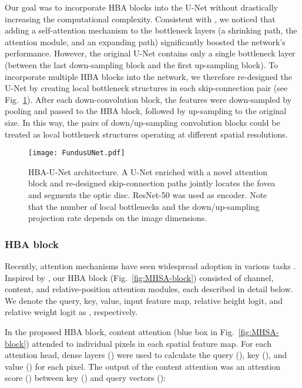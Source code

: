 \documentclass[hidelinks,runningheads]{llncs}
\begin{document}
Our goal was to incorporate \ac{HBA} blocks into the U-Net without drastically increasing the computational complexity.
Consistent with \cite{srinivas_bottleneck_2021}, we noticed that adding a self-attention mechanism to the bottleneck layers (a shrinking path, the attention module, and an expanding path) significantly boosted the network's performance.
However, the original U-Net contains only a single bottleneck layer (between the last down-sampling block and the first up-sampling block).
To incorporate multiple HBA blocks into the network, we therefore re-designed the U-Net by creating local bottleneck structures in each skip-connection pair (see Fig.~\ref{fig:architecture}).
After each down-convolution block, the features were down-sampled by pooling and passed to the HBA block, followed by up-sampling to the original size. In this way, the pairs of down/up-sampling convolution blocks could be treated as local bottleneck structures operating at different spatial resolutions. 

\begin{figure}[!t]
    \centering
    \texttt{[image: FundusUNet.pdf]}
    \caption{HBA-U-Net architecture. A U-Net enriched with a novel attention block and re-designed skip-connection paths jointly locates the fovea and segments the optic disc. ResNet-50 was used as encoder. Note that the number of local bottlenecks and the down/up-sampling projection rate depends on the image dimensions. }
    \label{fig:architecture}
\end{figure}


\subsubsection{HBA block}



Recently, attention mechanisms have seen widespread adoption in various tasks \cite{vaswani_attention_2017}. 
Inspired by \cite{srinivas_bottleneck_2021,DBLP:journals/corr/abs-1807-06521}, our \ac{HBA} block (Fig.~\ref{fig:MHSA-block}) consisted of channel, content, and relative-position attention modules, each described in detail below. We denote the query, key, value, input feature map, relative height logit, and relative weight logit as , respectively. 

In the proposed \ac{HBA} block, content attention (blue box in Fig.~\ref{fig:MHSA-block}) attended to individual pixels in each spatial feature map. For each attention head, dense layers () were used to calculate the query (), key (), and value () for each pixel. The output of the content attention was an attention score () between key () and query vectors ():
\end{document}
